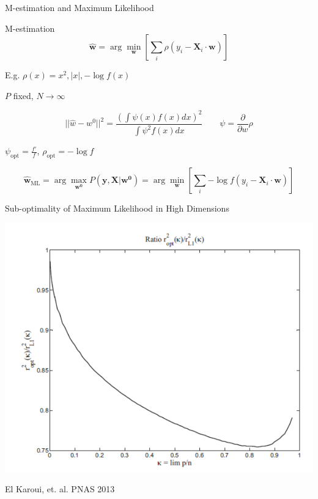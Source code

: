 \documentclass[pdf]{beamer}
\newcommand{\ra}{\rightarrow}
\begin{document}
\begin{frame}{M-estimation and Maximum Likelihood}

\begin{block}{M-estimation}
\begin{equation*}
\mathbf{\hat{w}}=\arg \min_{\mathbf{w}}{\left[ \sum_{i} {\rho\left( y_i - \mathbf{X}_{i} \cdot \mathbf{w}\right)}\right]}
\end{equation*}

E.g. $\rho(x) = x^2,|x|,-\log f(x)$
\end{block}
\vspace{.1in}
$P$ fixed, $N\ra \infty$

\begin{equation*}
||\hat{w}-w^0||^2 = \frac{\left(\int{\psi(x)f(x)dx}\right)^2}{\int{\psi^2f(x)dx}} \quad\quad \psi = \frac{\partial}{\partial w} \rho
\end{equation*}


\vspace{.1in}
$\psi_{\text{opt}} = \frac{f'}{f}$, $\rho_{\text{opt}} = -\log f$


\begin{equation*}
\mathbf{\hat{w}}_{\text{ML}}=\arg\max_{\mathbf{w^0}}{P\left(\mathbf{y},\mathbf{X}|\mathbf{w^0}\right)} =\arg \min_{\mathbf{w}}{\left[ \sum_{i} {-\log f\left( y_i - \mathbf{X}_{i} \cdot \mathbf{w}\right)}\right]}
\end{equation*}





\end{frame}



\begin{frame}{Sub-optimality of Maximum Likelihood in High Dimensions}


\begin{center}
\includegraphics[width = .7\linewidth]{elKaroui_MLsubopt.pdf}


El Karoui, et. al. PNAS 2013
\end{center}



\end{frame}
\end{document}
